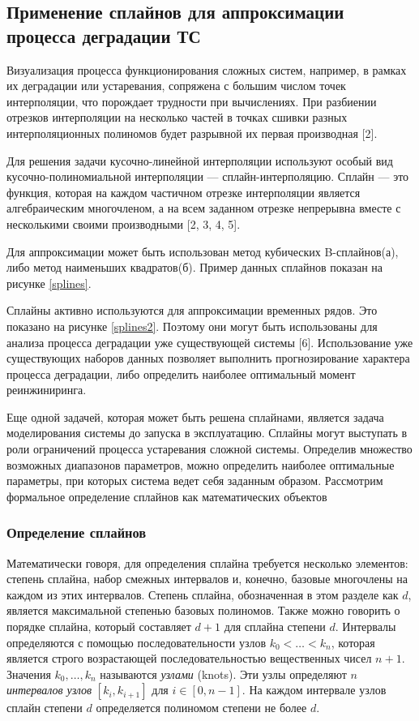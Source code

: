 \subsection{Применение сплайнов для аппроксимации процесса деградации ТС}
Визуализация процесса функционирования сложных систем, например, в рамках их деградации или устаревания, сопряжена с большим числом точек интерполяции, что порождает трудности при вычислениях. 
При разбиении отрезков интерполяции на несколько частей в точках сшивки разных интерполяционных полиномов будет разрывной их первая производная [2]. 

Для решения задачи кусочно-линейной интерполяции используют особый вид кусочно-полиномиальной интерполяции — сплайн-интерполяцию. 
Сплайн — это функция, которая на каждом частичном отрезке интерполяции является алгебраическим многочленом, а на всем заданном отрезке непрерывна вместе с несколькими своими производными [2, 3, 4, 5].

Для аппроксимации может быть использован метод кубических B-сплайнов(а), либо метод наименьших квадратов(б). 
Пример данных сплайнов показан на рисунке \ref{splines}.


Сплайны активно используются для аппроксимации временных рядов.
Это показано на рисунке \ref{splines2}. 
Поэтому они могут быть использованы для анализа процесса деградации уже существующей системы [6]. 
Использование уже существующих наборов данных позволяет выполнить прогнозирование характера процесса деградации, либо определить наиболее оптимальный момент реинжиниринга.


Еще одной задачей, которая может быть решена сплайнами, является задача моделирования системы до запуска в эксплуатацию. 
Сплайны могут выступать в роли ограничений процесса устаревания сложной системы. 
Определив множество возможных диапазонов параметров, можно определить наиболее оптимальные параметры, при которых система ведет себя заданным образом.
Рассмотрим формальное определение сплайнов как математических объектов

\subsubsection{Определение сплайнов}
Математически говоря, для определения сплайна требуется несколько элементов: степень сплайна, набор смежных интервалов и, конечно, базовые многочлены на каждом из этих интервалов.
Степень сплайна, обозначенная в этом разделе как $ d $, является максимальной степенью базовых полиномов.
Также можно говорить о порядке сплайна, который составляет $ d + 1 $ для сплайна степени $ d $.
Интервалы определяются с помощью последовательности узлов $ k_0 <\ldots <k_n $, которая является строго возрастающей последовательностью вещественных чисел $ n + 1 $.
Значения $ k_0, \ldots, k_n $ называются \emph{узлами} (knots).
Эти узлы определяют $ n $ \emph{интервалов узлов} $ [k_i, k_ {i + 1}] $ для $ i \in [0, n-1] $.
На каждом интервале узлов сплайн степени $ d $ определяется полиномом степени не более $ d $.

